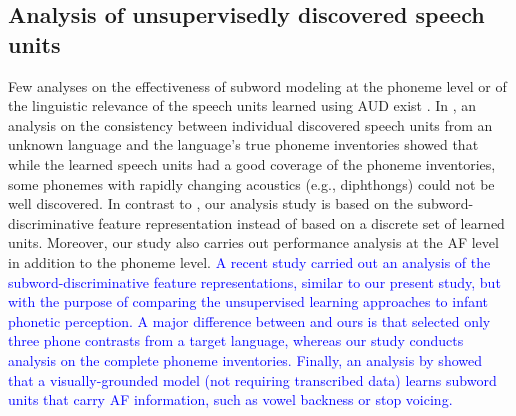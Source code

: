 \documentclass[transmag]{IEEEtran}
\begin{document}


\subsection{Analysis of unsupervisedly discovered speech units}
Few analyses on the effectiveness of subword modeling at the phoneme level or of the linguistic relevance of the speech units learned using AUD exist \cite{feng2017linguistic,harwath2019towards,matusevych2020evaluating}. 
In \cite{feng2017linguistic}, an analysis on the consistency between individual discovered speech units from an unknown language and the language’s true phoneme inventories showed that while the learned speech units had a good coverage of the phoneme inventories, some phonemes with rapidly changing acoustics (e.g., diphthongs) could not be well discovered. In contrast to  \cite{feng2017linguistic},  our analysis study is based on the subword-discriminative feature representation instead of based on a discrete set of learned units. Moreover, our study also carries out performance analysis at the AF level in addition to the phoneme level. %
\textcolor{blue}{A recent study \cite{matusevych2020evaluating} carried out an  analysis of the subword-discriminative feature representations, similar to our present study,  but with the purpose of comparing the unsupervised learning approaches to infant phonetic perception. A major difference between \cite{matusevych2020evaluating} and ours is that \cite{matusevych2020evaluating} selected only three phone contrasts from a target language, whereas our study conducts analysis on the complete phoneme inventories.
Finally, an analysis by \cite{harwath2019towards} showed that  a visually-grounded model (not requiring transcribed data) learns  subword units that carry AF information, such as  vowel backness or stop voicing. }

\end{document}
